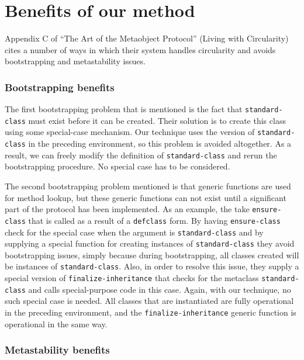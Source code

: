 \section{Benefits of our method}
\label{sec-benefits}

Appendix C of ``The Art of the Metaobject Protocol''
\cite{Kiczales:1991:AMP:574212} (Living with Circularity) cites a
number of ways in which their system handles circularity and avoids
bootstrapping and metastability issues.

\subsubsection{Bootstrapping benefits}

The first bootstrapping problem that is mentioned is the fact that
\texttt{standard-class} must exist before it can be created.  Their
solution is to create this class using some special-case mechanism.
Our technique uses the version of \texttt{standard-class} in the
preceding environment, so this problem is avoided altogether.  As a
result, we can freely modify the definition of
\texttt{standard-class} and rerun the bootstrapping procedure.  No
special case has to be considered.

The second bootstrapping problem mentioned is that generic functions
are used for method lookup, but these generic functions can not exist
until a significant part of the protocol has been implemented.  As an
example, the take \texttt{ensure-class} that is called as a result of
a \texttt{defclass} form.  By having \texttt{ensure-class} check for
the special case when the argument is \texttt{standard-class} and by
supplying a special function for creating instances of
\texttt{standard-class} they avoid bootstrapping issues, simply
because during bootstrapping, all classes created will be instances of
\texttt{standard-class}.  Also, in order to resolve this issue, they
supply a special version of \texttt{finalize-inheritance} that checks
for the metaclass \texttt{standard-class} and calls special-purpose
code in this case.  Again, with our technique, no such special case is
needed.  All classes that are instantiated are fully operational in
the preceding environment, and the \texttt{finalize-inheritance}
generic function is operational in the same way.

\subsubsection{Metastability benefits}


